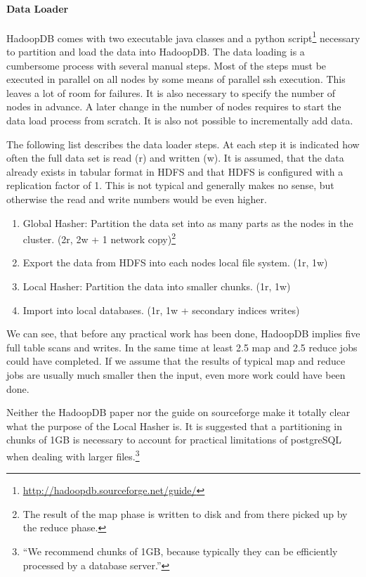 \documentclass[12pt,a4paper]{scrartcl}		%
\begin{document}
\paragraph{Data Loader}
HadoopDB comes with two executable java classes and a python script\footnote{\url{http://hadoopdb.sourceforge.net/guide/}} necessary to partition and load the data into HadoopDB. The data loading is a cumbersome process with several manual steps. Most of the steps must be executed in parallel on all nodes by some means of parallel ssh execution. This leaves a lot of room for failures. It is also necessary to specify the number of nodes in advance. A later change in the number of nodes requires to start the data load process from scratch. It is also not possible to incrementally add data.

The following list describes the data loader steps. At each step it is indicated how often the full data set is read (r) and written (w). It is assumed, that the data already exists in tabular format in HDFS and that HDFS is configured with a replication factor of 1. This is not typical and generally makes no sense, but otherwise the read and write numbers would be even higher.

\begin{enumerate}
\item Global Hasher: Partition the data set into as many parts as the nodes in the cluster. (2r, 2w + 1 network copy)\footnote{The result of the map phase is written to disk and from there picked up by the reduce phase.}
\item Export the data from HDFS into each nodes local file system. (1r, 1w)
\item Local Hasher: Partition the data into smaller chunks. (1r, 1w)
\item Import into local databases. (1r, 1w + secondary indices writes)
\end{enumerate}

We can see, that before any practical work has been done, HadoopDB implies five full table scans and writes. In the same time at least 2.5 map and 2.5 reduce jobs could have completed. If we assume that the results of typical map and reduce jobs are usually much smaller then the input, even more work could have been done.

Neither the HadoopDB paper nor the guide on sourceforge make it totally clear what the purpose of the Local Hasher is. It is suggested that a partitioning in chunks of 1GB is necessary to account for practical limitations of postgreSQL when dealing with larger files.\footnote{``We recommend chunks of 1GB, because typically they can be efficiently processed by a database server.''}
\end{document}
